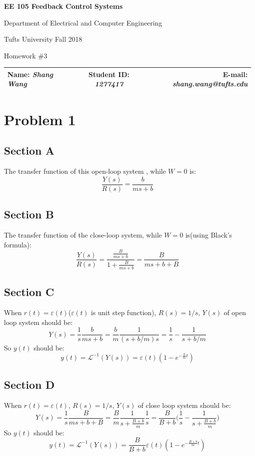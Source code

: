 \documentclass[a4paper]{article}
\begin{document}
\begin{center}
\bf\Large
EE 105 Feedback Control Systems\par
Department of Electrical and Computer Engineering\par
Tufts University Fall 2018\par
Homework \#3\par   
\end{center}
\begin{table}[H]
\begin{center}
\begin{tabular*}{\textwidth}{@{\extracolsep{\fill}}lcr}
Name: {\it Shang Wang} &Student ID: {\it 1277417} &E-mail: {\it shang.wang@tufts.edu}\\
\hline
\end{tabular*}
\end{center}
\end{table}

\section{Problem 1}
\subsection{Section A}
The transfer function of this open-loop system , while $W = 0$ is:
$$
\frac{Y(s)}{R(s)} = \frac{b}{ms+b}
$$
\subsection{Section B}
The transfer function of the close-loop system, while $W = 0$ is(using Black's formula):
$$
\frac{Y(s)}{R(s)} =\frac{\frac{B}{ms+b}}{1 + \frac{B}{ms+b}} = \frac{B}{ms+b+B}
$$
\subsection{Section C}
When $r(t) = \varepsilon(t)$($\varepsilon(t)$ is unit step function), $R(s) = 1/s$, $Y(s)$ of open loop system should be:
$$
Y(s) = \frac1s\frac{b}{ms+b} = \frac{b}{m}\frac{1}{(s+b/m)s} = \frac1s - \frac{1}{s+b/m}
$$
So $y(t)$ should be:
$$
y(t) = \mathcal{L}^{-1} (Y(s)) = \varepsilon(t)(1-e^{-\frac bmt})
$$
\subsection{Section D}
When $r(t) = \varepsilon(t)$, $R(s) = 1/s$, $Y(s)$ of close loop system should be:
$$
Y(s) = \frac1s\frac{B}{ms+b+B}= \frac{B}{m}\frac{1}{s+\frac{B+b}{m}}\frac1s = \frac{B}{B+b} \Big(\frac{1}{s}-\frac{1}{s+\frac{B+b}{m}}\Big)
$$
So $y(t)$ should be:
$$
y(t) = \mathcal{L}^{-1} (Y(s)) = \frac{B}{B+b} \varepsilon(t)(1-e^{-\frac{B+b}{m}t})
$$
\end{document}
